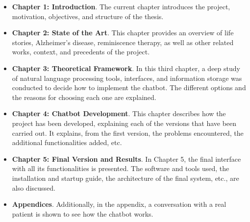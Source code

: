 \begin{itemize}
	\item \textbf{Chapter 1: Introduction}. The current chapter introduces the project, motivation, objectives, and structure of the thesis.
	\item \textbf{Chapter 2: State of the Art}. This chapter provides an overview of life stories, Alzheimer's disease, reminiscence therapy, as well as other related works, context, and precedents of the project.
	\item \textbf{Chapter 3: Theoretical Framework}. In this third chapter, a deep study of natural language processing tools, interfaces, and information storage was conducted to decide how to implement the chatbot. The different options and the reasons for choosing each one are explained.
	\item \textbf{Chapter 4: Chatbot Development}. This chapter describes how the project has been developed, explaining each of the versions that have been carried out. It explains, from the first version, the problems encountered, the additional functionalities added, etc.
	\item \textbf{Chapter 5: Final Version and Results}. In Chapter 5, the final interface with all its functionalities is presented. The software and tools used, the installation and startup guide, the architecture of the final system, etc., are also discussed.
	\item \textbf{Appendices}. Additionally, in the appendix, a conversation with a real patient is shown to see how the chatbot works.
\end{itemize}













